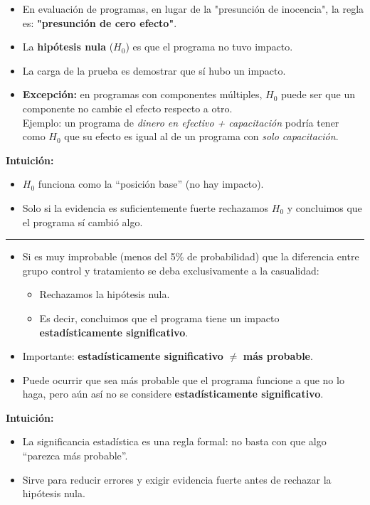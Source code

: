 \documentclass[12pt]{article}
\begin{document}
\begin{itemize}
    \item En evaluación de programas, en lugar de la "presunción de inocencia", la regla es: \textbf{"presunción de cero efecto"}.
    \item La \textbf{hipótesis nula} ($H_0$) es que el programa no tuvo impacto.
    \item La carga de la prueba es demostrar que sí hubo un impacto.
    \item \textbf{Excepción:} en programas con componentes múltiples, $H_0$ puede ser que un componente no cambie el efecto respecto a otro.  
    \\ Ejemplo: un programa de \textit{dinero en efectivo + capacitación} podría tener como $H_0$ que su efecto es igual al de un programa con \textit{solo capacitación}.
\end{itemize}

\textbf{Intuición:}
\begin{itemize}
    \item $H_0$ funciona como la “posición base” (no hay impacto).
    \item Solo si la evidencia es suficientemente fuerte rechazamos $H_0$ y concluimos que el programa sí cambió algo.  
\end{itemize}

\hrule

\begin{itemize}
    \item Si es muy improbable (menos del 5\% de probabilidad) que la diferencia entre grupo control y tratamiento se deba exclusivamente a la casualidad:
    \begin{itemize}
        \item Rechazamos la hipótesis nula. 
        \item Es decir, concluimos que el programa tiene un impacto \textbf{estadísticamente significativo}.
    \end{itemize}
    
    \item Importante: \textbf{estadísticamente significativo} $\neq$ \textbf{más probable}.
    
    \item Puede ocurrir que sea más probable que el programa funcione a que no lo haga, pero aún así no se considere \textbf{estadísticamente significativo}.
\end{itemize}

\textbf{Intuición:}
\begin{itemize}
    \item La significancia estadística es una regla formal: no basta con que algo “parezca más probable”. 
    \item Sirve para reducir errores y exigir evidencia fuerte antes de rechazar la hipótesis nula.
\end{itemize}
\end{document}
